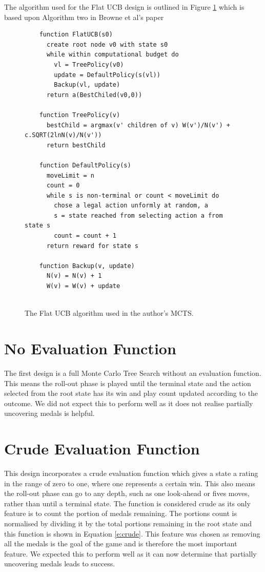 \documentclass{bhamthesis}
\theoremstyle{definition}
\begin{document}
The algorithm used for the Flat UCB design is outlined in Figure \ref{l:FlatUCB} which is based upon Algorithm two in Browne et al's paper \cite{Browne2012}


\begin{figure}[h]
	\centering
	\begin{verbatim}
	function FlatUCB(s0)
	  create root node v0 with state s0
	  while within computational budget do
	    vl = TreePolicy(v0)
	    update = DefaultPolicy(s(vl))
	    Backup(vl, update)
	  return a(BestChiled(v0,0))
	
	function TreePolicy(v)
	  bestChild = argmax(v' children of v) W(v')/N(v') + c.SQRT(2lnN(v)/N(v'))
	  return bestChild
	  
	function DefaultPolicy(s)
	  moveLimit = n
	  count = 0
	  while s is non-terminal or count < moveLimit do
	    chose a legal action unformly at random, a
	    s = state reached from selecting action a from state s
	    count = count + 1
	  return reward for state s
	
	function Backup(v, update)
	  N(v) = N(v) + 1
	  W(v) = W(v) + update
	
	\end{verbatim}\label{l:FlatUCB}
	\caption{The Flat UCB algorithm used in the author's MCTS.}
\end{figure}




\section{No Evaluation Function}\label{s:noEval}
The first design is a full Monte Carlo Tree Search without an evaluation function. This means the roll-out phase is played until the terminal state and the action selected from the root state has its win and play count updated according to the outcome. We did not expect this to perform well as it does not realise partially uncovering medals is helpful.

\section{Crude Evaluation Function}\label{s:crudeF}
This design incorporates a crude evaluation function which gives a state a rating in the range of zero to one, where one represents a certain win. This also means the roll-out phase can go to any depth, such as one look-ahead or fives moves, rather than until a terminal state. The function is considered crude as its only feature is to count the portion of medals remaining. The portions count is normalised by dividing it by the total portions remaining in the root state and this function is shown in Equation \ref{e:crude}. This feature was chosen as removing all the medals is the goal of the game and is therefore the most important feature. We expected this to perform well as it can now determine that partially uncovering medals leads to success.
\end{document}

